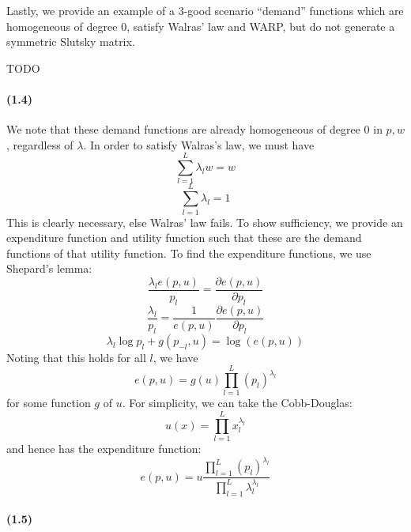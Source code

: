 \documentclass[10pt,letter]{article}
\begin{document}
Lastly, we provide an example of a 3-good scenario ``demand'' functions which are homogeneous of degree 0, satisfy Walras' law and WARP, but do not generate a symmetric Slutsky matrix.


TODO 


\paragraph{(1.4)}
We note that these demand functions are already homogeneous of degree 0 in $p,w$, regardless of $\lambda$. In order to satisfy Walras's law, we must have
\[ \sum_{l=1}^L \lambda_lw = w \]
\[ \sum_{l=1}^L \lambda_l = 1 \]
This is clearly necessary, else Walras' law fails. To show sufficiency, we provide an expenditure function and utility function such that these are the demand functions of that utility function. To find the expenditure functions, we use Shepard's lemma:
\[ \frac{\lambda_l e(p, u)}{p_l} = \frac{\partial e(p,u)}{\partial p_l}  \]
\[ \frac{\lambda_l}{p_l} = \frac{1}{e(p,u)} \frac{\partial e(p,u)}{\partial p_l}  \]
\[ \lambda_l \log p_l + g(p_{-l}, u) = \log (e(p,u)) \]
Noting that this holds for all $l$, we have
\[ e(p,u) = g(u)\prod_{l=1}^L (p_l)^{\lambda_l}  \]
for some function $g$ of $u$. For simplicity, we can take the Cobb-Douglas:
\[ u(x) = \prod_{l=1}^L x_l^{\lambda_l} \]
and hence has the expenditure function:
\[ e(p,u) = u\frac{\prod_{l=1}^L (p_l)^{\lambda_l}}{\prod_{l=1}^L \lambda_l^{\lambda_l}} \]
\paragraph{(1.5)}
\end{document}
